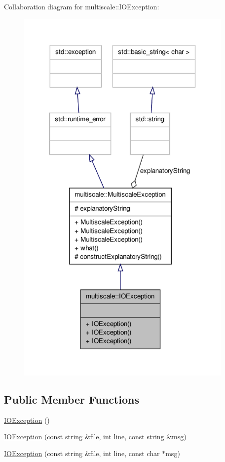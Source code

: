 \-Collaboration diagram for multiscale\-:\-:\-I\-O\-Exception\-:
\nopagebreak
\begin{figure}[H]
\begin{center}
\leavevmode
\includegraphics[width=300pt]{classmultiscale_1_1IOException__coll__graph}
\end{center}
\end{figure}
\subsection*{\-Public \-Member \-Functions}
\begin{DoxyCompactItemize}
\item 
\hyperlink{classmultiscale_1_1IOException_a08e300bad1251ba4badd004e11507c8c}{\-I\-O\-Exception} ()
\item 
\hyperlink{classmultiscale_1_1IOException_a081bb2e4c214a18cbace0d93e1b60488}{\-I\-O\-Exception} (const string \&file, int line, const string \&msg)
\item 
\hyperlink{classmultiscale_1_1IOException_a2ccacf8690ac56b07af15da7fa7bb93a}{\-I\-O\-Exception} (const string \&file, int line, const char $\ast$msg)
\end{DoxyCompactItemize}


